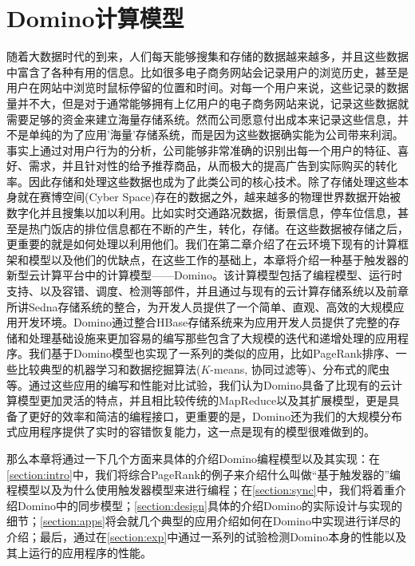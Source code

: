 \chapter{Domino计算模型}
\label{chapter:domino}
随着大数据时代的到来，人们每天能够搜集和存储的数据越来越多，并且这些数据中富含了各种有用的信息。比如很多电子商务网站会记录用户的浏览历史，甚至是用户在网站中浏览时鼠标停留的位置和时间。对每一个用户来说，这些记录的数据量并不大，但是对于通常能够拥有上亿用户的电子商务网站来说，记录这些数据就需要足够的资金来建立海量存储系统。然而公司愿意付出成本来记录这些信息，并不是单纯的为了应用'海量'存储系统，而是因为这些数据确实能为公司带来利润。事实上通过对用户行为的分析，公司能够非常准确的识别出每一个用户的特征、喜好、需求，并且针对性的给予推荐商品，从而极大的提高广告到实际购买的转化率。因此存储和处理这些数据也成为了此类公司的核心技术。除了存储处理这些本身就在赛博空间(Cyber Space)存在的数据之外，越来越多的物理世界数据开始被数字化并且搜集以加以利用。比如实时交通路况数据，街景信息，停车位信息，甚至是热门饭店的排位信息都在不断的产生，转化，存储。在这些数据被存储之后，更重要的就是如何处理以利用他们。我们在第二章介绍了在云环境下现有的计算框架和模型以及他们的优缺点，在这些工作的基础上，本章将介绍一种基于触发器的新型云计算平台中的计算模型——Domino。该计算模型包括了编程模型、运行时支持、以及容错、调度、检测等部件，并且通过与现有的云计算存储系统以及前章所讲Sedna存储系统的整合，为开发人员提供了一个简单、直观、高效的大规模应用开发环境。Domino通过整合HBase存储系统来为应用开发人员提供了完整的存储和处理基础设施来更加容易的编写那些包含了大规模的迭代和递增处理的应用程序。我们基于Domino模型也实现了一系列的类似的应用，比如PageRank排序、一些比较典型的机器学习和数据挖掘算法($K$-means, 协同过滤等)、分布式的爬虫等。通过这些应用的编写和性能对比试验，我们认为Domino具备了比现有的云计算模型更加灵活的特点，并且相比较传统的MapReduce以及其扩展模型，更是具备了更好的效率和简洁的编程接口，更重要的是，Domino还为我们的大规模分布式应用程序提供了实时的容错恢复能力，这一点是现有的模型很难做到的。

那么本章将通过一下几个方面来具体的介绍Domino编程模型以及其实现：在\ref{section:intro}中，我们将综合PageRank的例子来介绍什么叫做“基于触发器的”编程模型以及为什么使用触发器模型来进行编程；在\ref{section:sync}中，我们将着重介绍Domino中的同步模型；\ref{section:design}具体的介绍Domino的实际设计与实现的细节；\ref{section:apps}将会就几个典型的应用介绍如何在Domino中实现进行详尽的介绍；最后，通过在\ref{section:exp}中通过一系列的试验检测Domino本身的性能以及其上运行的应用程序的性能。

